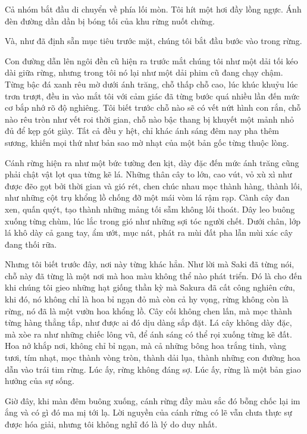 \documentclass[../main.tex]{subfiles}
\begin{document}
Cả nhóm bắt đầu di chuyển về phía lối mòn. Tôi hít một hơi đầy lồng ngực. Ánh đèn đường dần dần bị bóng tối của khu rừng nuốt chửng.

Và, như đã định sẵn mục tiêu trước mặt, chúng tôi bắt đầu bước vào trong rừng.

\ct

Con đường dẫn lên ngôi đền cũ hiện ra trước mắt chúng tôi như một dải tối kéo dài giữa rừng, nhưng trong tôi nó lại như một dải phim cũ đang chạy chậm. Từng bậc đá xanh rêu mờ dưới ánh trăng, chỗ thấp chỗ cao, lúc khúc khuỷu lúc trơn trượt, đều in vào mắt tôi với cảm giác đã từng bước quá nhiều lần đến mức cơ bắp nhớ rõ độ nghiêng. Tôi biết trước chỗ nào sẽ có vết nứt hình con rắn, chỗ nào rêu tròn như vết roi thời gian, chỗ nào bậc thang bị khuyết một mảnh nhỏ đủ để kẹp gót giày. Tất cả đều y hệt, chỉ khác ánh sáng đêm nay pha thêm sương, khiến mọi thứ như bản sao mờ nhạt của một bản gốc từng thuộc lòng.

Cánh rừng hiện ra như một bức tường đen kịt, dày đặc đến mức ánh trăng cũng phải chật vật lọt qua từng kẽ lá. Những thân cây to lớn, cao vút, vỏ xù xì như được đẽo gọt bởi thời gian và gió rét, chen chúc nhau mọc thành hàng, thành lối, như những cột trụ khổng lồ chống đỡ một mái vòm lá rậm rạp. Cành cây đan xen, quấn quýt, tạo thành những mảng tối sẫm không lối thoát. Dây leo buông xuống từng chùm, lúc lắc trong gió như những sợi tóc người chết. Dưới chân, lớp lá khô dày cả gang tay, ẩm ướt, mục nát, phát ra mùi đất pha lẫn mùi xác cây đang thối rữa.

Nhưng tôi biết trước đây, nơi này từng khác hẳn. Như lời mà Saki đã từng nói, chỗ này đã từng là một nơi mà hoa màu không thể nào phát triển. Đó là cho đến khi chúng tôi gieo những hạt giống thần kỳ mà Sakura đã cất công nghiên cứu, khi đó, nó không chỉ là hoa bỉ ngạn đỏ mà còn cả hy vọng, rừng không còn là rừng, nó đã là một vườn hoa khổng lồ. Cây cối không chen lấn, mà mọc thành từng hàng thẳng tắp, như được ai đó dịu dàng sắp đặt. Lá cây không dày đặc, mà xòe ra như những chiếc lông vũ, để ánh sáng có thể rọi xuống từng kẽ đất. Hoa nở khắp nơi, không chỉ bỉ ngạn, mà cả những bông hoa trắng tinh, vàng tươi, tím nhạt, mọc thành vòng tròn, thành dải lụa, thành những con đường hoa dẫn vào trái tim rừng. Lúc ấy, rừng không đáng sợ. Lúc ấy, rừng là một bản giao hưởng của sự sống.

Giờ đây, khi màn đêm buông xuống, cánh rừng đầy màu sắc đó bỗng chốc lại im ắng và có gì đó ma mị tới lạ. Lời nguyền của cánh rừng có lẽ vẫn chưa thực sự được hóa giải, nhưng tôi không nghĩ đó là lý do duy nhất.
\end{document}
